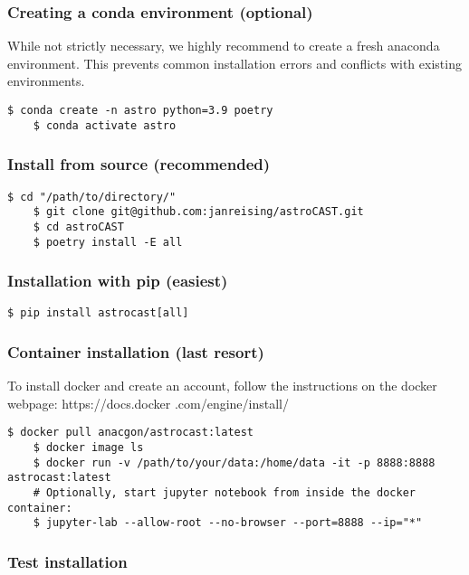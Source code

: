 \subsubsection{Creating a conda environment (optional)}
While not strictly necessary, we highly recommend to create a fresh anaconda environment. This
prevents common installation errors and conflicts with existing environments.

\begin{lstlisting}[style=bashStyle]
    $ conda create -n astro python=3.9 poetry
    $ conda activate astro
\end{lstlisting}

\subsubsection{Install from source (recommended)}
\label{res:install-from-source}
\begin{lstlisting}[style=bashStyle]
    $ cd "/path/to/directory/"
    $ git clone git@github.com:janreising/astroCAST.git
    $ cd astroCAST
    $ poetry install -E all
\end{lstlisting}

\subsubsection{Installation with pip (easiest)}
\begin{lstlisting}[style=bashStyle]
    $ pip install astrocast[all]
\end{lstlisting}

\subsubsection{Container installation (last resort)}

To install docker and create an account, follow the instructions on the docker webpage: https://docs.docker
.com/engine/install/

\begin{lstlisting}[style=bashStyle]
    $ docker pull anacgon/astrocast:latest
    $ docker image ls
    $ docker run -v /path/to/your/data:/home/data -it -p 8888:8888 astrocast:latest
    # Optionally, start jupyter notebook from inside the docker container:
    $ jupyter-lab --allow-root --no-browser --port=8888 --ip="*"
\end{lstlisting}

\subsubsection{Test installation}

